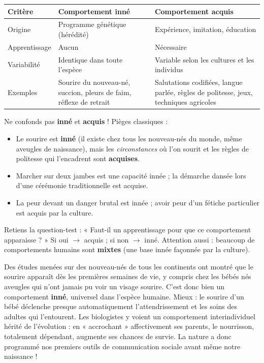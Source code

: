 \documentclass[11pt]{article}
\begin{document}
\begin{center}
\begin{tabularx}{\linewidth}{|l|X|X|}
\hline
\rowcolor{popblueL} \textbf{Critère} & \textbf{Comportement inné} & \textbf{Comportement acquis} \\
\hline
Origine & Programme génétique (hérédité) & Expérience, imitation, éducation \\
\hline
Apprentissage & Aucun & Nécessaire \\
\hline
Variabilité & Identique dans toute l'espèce & Variable selon les cultures et les individus \\
\hline
Exemples & Sourire du nouveau-né, succion, pleurs de faim, réflexe de retrait & Salutations codifiées, langue parlée, règles de politesse, jeux, techniques agricoles \\
\hline
\end{tabularx}
\end{center}

\begin{attention}
Ne confonds pas \textbf{inné} et \textbf{acquis} ! Pièges classiques :
\begin{itemize}
\item Le sourire est \textbf{inné} (il existe chez tous les nouveau-nés du monde, même aveugles de naissance), mais les \emph{circonstances} où l'on sourit et les règles de politesse qui l'encadrent sont \textbf{acquises}.
\item Marcher sur deux jambes est une capacité innée ; la démarche dansée lors d'une cérémonie traditionnelle est acquise.
\item La peur devant un danger brutal est innée ; avoir peur d'un fétiche particulier est acquis par la culture.
\end{itemize}
Retiens la question-test : « Faut-il un apprentissage pour que ce comportement apparaisse ? » Si oui $\rightarrow$ acquis ; si non $\rightarrow$ inné. Attention aussi : beaucoup de comportements humains sont \textbf{mixtes} (une base innée façonnée par la culture).
\end{attention}

\begin{savaistu}
Des études menées sur des nouveau-nés de tous les continents ont montré que le sourire apparaît dès les premières semaines de vie, y compris chez les bébés nés aveugles qui n'ont jamais pu voir un visage sourire. C'est donc bien un comportement \textbf{inné}, universel dans l'espèce humaine. Mieux : le sourire d'un bébé déclenche presque automatiquement l'attendrissement et les soins des adultes qui l'entourent. Les biologistes y voient un comportement interindividuel hérité de l'évolution : en « accrochant » affectivement ses parents, le nourrisson, totalement dépendant, augmente ses chances de survie. La nature a donc programmé nos premiers outils de communication sociale avant même notre naissance !
\end{savaistu}
\end{document}
